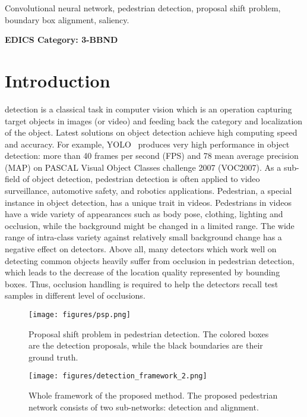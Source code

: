 \documentclass[journal]{IEEEtran}
\begin{document}
\begin{IEEEkeywords}
Convolutional neural network, pedestrian detection, proposal shift problem, boundary box alignment, saliency.
\end{IEEEkeywords}

\ifCLASSOPTIONpeerreview
\begin{center} \bfseries EDICS Category: 3-BBND \end{center}
\fi
\IEEEpeerreviewmaketitle

\section{Introduction}
\label{sec:introduction}
 detection is a classical task in computer vision which is an operation capturing target objects in images (or video) and feeding back the category and localization of the object. Latest solutions on object detection achieve high computing speed and accuracy. For example, YOLO~\cite{redmon2016yolo9000} produces very high performance in object detection: more than 40 frames per second (FPS) and 78 mean average precision (MAP) on PASCAL Visual Object Classes challenge 2007 (VOC2007). As a sub-field of object detection, pedestrian detection is often applied to video surveillance, automotive safety, and robotics applications. Pedestrian, a special instance in object detection, has a unique trait in videos. Pedestrians in videos have a wide variety of appearances such as body pose, clothing, lighting and occlusion, while the background might be changed in a limited range. The wide range of intra-class variety against relatively small background change has a negative effect on detectors. Above all, many detectors which work well on detecting common objects heavily suffer from occlusion in pedestrian detection, which leads to the decrease of the location quality represented by bounding boxes. Thus, occlusion handling is required to help the detectors recall test samples in different level of occlusions.

\begin{figure}[t]
\centering
\centerline{\texttt{[image: figures/psp.png]}}
\caption{Proposal shift problem in pedestrian detection. The colored boxes are the detection proposals, while the black boundaries are their ground truth.}
\label{fig:shiftP}
\end{figure}
\begin{figure*}[t]
\centering
\centerline{\texttt{[image: figures/detection\_framework\_2.png]}}
\caption{Whole framework of the proposed method. The proposed pedestrian network consists of two sub-networks: detection and alignment. }
\label{fig:framework}
\end{figure*}
\end{document}
